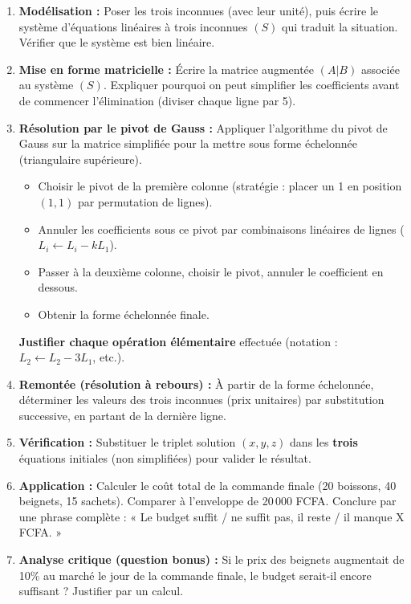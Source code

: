 \documentclass[11pt]{article}
\begin{document}
\begin{enumerate}
    \item \textbf{Modélisation :} Poser les trois inconnues (avec leur unité), puis écrire le système d'équations linéaires à trois inconnues $(S)$ qui traduit la situation. Vérifier que le système est bien linéaire.
    \item \textbf{Mise en forme matricielle :} Écrire la matrice augmentée $(A|B)$ associée au système $(S)$. Expliquer pourquoi on peut simplifier les coefficients avant de commencer l'élimination (diviser chaque ligne par 5).
    \item \textbf{Résolution par le pivot de Gauss :} Appliquer l'algorithme du pivot de Gauss sur la matrice simplifiée pour la mettre sous forme échelonnée (triangulaire supérieure).
        \begin{itemize}
            \item Choisir le pivot de la première colonne (stratégie : placer un 1 en position $(1,1)$ par permutation de lignes).
            \item Annuler les coefficients sous ce pivot par combinaisons linéaires de lignes ($L_i \leftarrow L_i - k L_1$).
            \item Passer à la deuxième colonne, choisir le pivot, annuler le coefficient en dessous.
            \item Obtenir la forme échelonnée finale.
        \end{itemize}
        \textbf{Justifier chaque opération élémentaire} effectuée (notation : $L_2 \leftarrow L_2 - 3L_1$, etc.).
    \item \textbf{Remontée (résolution à rebours) :} À partir de la forme échelonnée, déterminer les valeurs des trois inconnues (prix unitaires) par substitution successive, en partant de la dernière ligne.
    \item \textbf{Vérification :} Substituer le triplet solution $(x,y,z)$ dans les \textbf{trois} équations initiales (non simplifiées) pour valider le résultat.
    \item \textbf{Application :} Calculer le coût total de la commande finale (20 boissons, 40 beignets, 15 sachets). Comparer à l'enveloppe de 20\,000 FCFA. Conclure par une phrase complète : « Le budget suffit / ne suffit pas, il reste / il manque X FCFA. »
    \item \textbf{Analyse critique (question bonus) :} Si le prix des beignets augmentait de 10\% au marché le jour de la commande finale, le budget serait-il encore suffisant ? Justifier par un calcul.
\end{enumerate}
\end{document}
